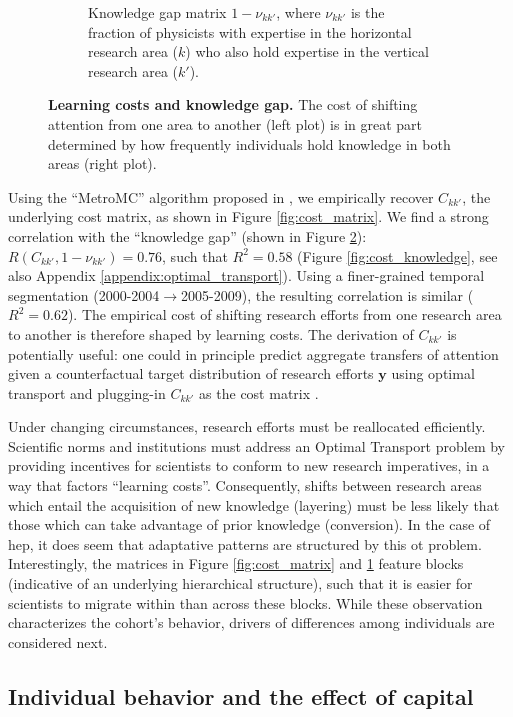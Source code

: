 \documentclass{article}
\begin{document}
\begin{figure}[!h]
\begin{subfigure}{0.475\textwidth}
    \caption{Knowledge gap matrix $1-\nu_{kk'}$, where $\nu_{kk'}$ is the fraction of physicists with expertise in the horizontal research area ($k$) who also hold expertise in the vertical research area ($k'$).}
    \label{fig:nu}
\end{subfigure}
\caption{\textbf{Learning costs and knowledge gap.} The cost of shifting attention from one area to another (left plot) is in great part determined by how frequently individuals hold knowledge in both areas (right plot).}
\label{fig:knowledge}
\end{figure}

Using the ``MetroMC'' algorithm proposed in \citealt{pmlr-v162-chiu22b}, we empirically recover $C_{kk'}$, the underlying cost matrix, as shown in Figure \ref{fig:cost_matrix}. We find a strong correlation with the ``knowledge gap'' (shown in Figure \ref{fig:knowledge}): $R(C_{kk'},1-\nu_{kk'})=0.76$, such that $R^2=0.58$ (Figure \ref{fig:cost_knowledge}, see also Appendix \ref{appendix:optimal_transport}). Using a finer-grained temporal segmentation (2000-2004$\to$2005-2009), the resulting correlation is similar ($R^2=0.62$). The empirical cost of shifting research efforts from one research area to another is therefore shaped by learning costs. The derivation of $C_{kk'}$ is potentially useful: one could in principle predict aggregate transfers of attention given a counterfactual target distribution of research efforts $\bm{y}$ using optimal transport and plugging-in $C_{kk'}$ as the cost matrix \citep{li2019learning}. 

Under changing circumstances, research efforts must be reallocated efficiently. Scientific norms and institutions must address an Optimal Transport problem by providing incentives for scientists to conform to new research imperatives, in a way that factors ``learning costs''. Consequently, shifts between research areas which entail the acquisition of new knowledge (layering) must be less likely that those which can take advantage of prior knowledge (conversion). In the case of \gls{hep}, it does seem that adaptative patterns are structured by this \gls{ot} problem. Interestingly, the matrices in Figure \ref{fig:cost_matrix} and \ref{fig:nu} feature blocks (indicative of an underlying hierarchical structure), such that it is easier for scientists to migrate within than across these blocks. While these observation characterizes the cohort's behavior, drivers of differences among individuals are considered next.

\subsection{\label{sec:comparative}Individual behavior and the effect of capital}
\end{document}
